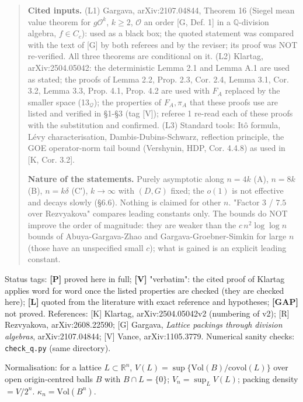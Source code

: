 \begin{quote}
\textbf{Cited inputs.} (L1) Gargava, arXiv:2107.04844, Theorem 16 (Siegel mean value theorem for \(g\mathcal O^k\), \(k\ge2\), \(\mathcal O\) an order {[}G, Def. 1{]} in a \(\mathbb Q\)-division algebra, \(f\in C_c\)): used as a black box; the quoted statement was compared with the text of {[}G{]} by both referees and by the reviser; its proof was NOT re-verified. All three theorems are conditional on it. (L2) Klartag, arXiv:2504.05042: the deterministic Lemma 2.1 and Lemma A.1 are used as stated; the proofs of Lemma 2.2, Prop. 2.3, Cor. 2.4, Lemma 3.1, Cor. 3.2, Lemma 3.3, Prop. 4.1, Prop. 4.2 are used with \(F_A\) replaced by the smaller space (13\(_\mathcal Q\)); the properties of \(F_A,\pi_A\) that these proofs use are listed and verified in §1-§3 (tag {[}V{]}); referee 1 re-read each of these proofs with the substitution and confirmed. (L3) Standard tools: Itô formula, Lévy characterisation, Dambis-Dubins-Schwarz, reflection principle, the GOE operator-norm tail bound (Vershynin, HDP, Cor. 4.4.8) as used in {[}K, Cor. 3.2{]}.

\textbf{Nature of the statements.} Purely asymptotic along \(n=4k\) (A), \(n=8k\) (B), \(n=k\delta\) (C′), \(k\to\infty\) with \((D,G)\) fixed; the \(o(1)\) is not effective and decays slowly (§6.6). Nothing is claimed for other \(n\). "Factor \(3\) / \(7.5\) over Rezvyakova" compares leading constants only. The bounds do NOT improve the order of magnitude: they are weaker than the \(c\,n^2\log\log n\) bounds of Abuya-Gargava-Zhao and Gargava-Groebner-Simkin for large \(n\) (those have an unspecified small \(c\)); what is gained is an explicit leading constant.
\end{quote}

Status tags: \textbf{{[}P{]}} proved here in full; \textbf{{[}V{]}} "verbatim": the cited proof of Klartag applies word for word once the listed
properties are checked (they are checked here); \textbf{{[}L{]}} quoted from the literature with exact reference and hypotheses; \textbf{{[}GAP{]}} not proved.
References: {[}K{]} Klartag, arXiv:2504.05042v2 (numbering of v2); {[}R{]} Rezvyakova, arXiv:2608.22590; {[}G{]} Gargava, \emph{Lattice packings
through division algebras}, arXiv:2107.04844; {[}V{]} Vance, arXiv:1105.3779. Numerical sanity checks: \texttt{check\_q.py} (same directory).

Normalisation: for a lattice \(L\subset\mathbb R^n\), \(V(L)=\sup\{\mathrm{Vol}(B)/\mathrm{covol}(L)\}\) over open origin-centred balls \(B\) with
\(B\cap L=\{0\}\); \(V_n=\sup_L V(L)\); packing density \(=V/2^n\). \(\kappa_n=\mathrm{Vol}(B^n)\).

